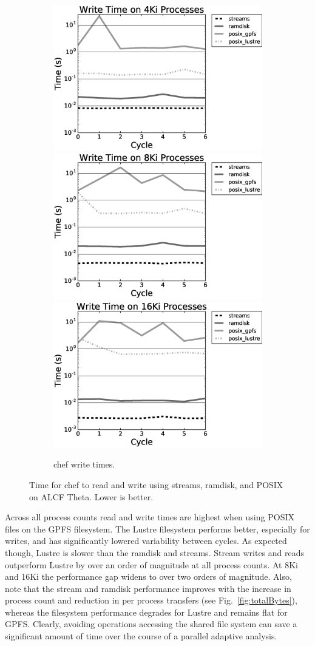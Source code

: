 \begin{figure}
\begin{subfigure}{.90\textwidth}
    \includegraphics[width=.49\textwidth]{results/phasta-dambreak/theta/chef4096write.eps}
    \includegraphics[width=.49\textwidth]{results/phasta-dambreak/theta/chef8192write.eps}
    \includegraphics[width=.49\textwidth]{results/phasta-dambreak/theta/chef16384write.eps}
    \caption{chef write times.}
    \label{fig:chefwrite}
  \end{subfigure}
  \caption{
    Time for chef to read and write using streams, ramdisk, and POSIX on ALCF
    Theta.  Lower is better.
  }
  \label{fig:cheftimes}
\end{figure}

Across all process counts read and write times are highest when using
POSIX files on the GPFS filesystem.
The Lustre filesystem performs better, especially for writes, and has
significantly lowered variability between cycles.
As expected though, Lustre is slower than the ramdisk and streams.
Stream writes and reads outperform Lustre by over an order of magnitude at all
process counts.
At 8Ki and 16Ki the performance gap widens to over two orders of magnitude.
Also, note that the stream and ramdisk performance improves with the increase in
process count and reduction in per process transfers (see
Fig.~\ref{fig:totalBytes}), whereas the filesystem performance degrades for
Lustre and remains flat for GPFS.
Clearly, avoiding operations accessing the shared file system can save a
significant amount of time over the course of a parallel adaptive analysis.

